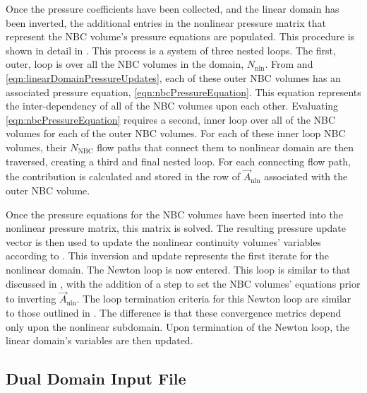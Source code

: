Once the pressure coefficients have been collected, and the linear domain has been inverted, the additional entries in the nonlinear pressure matrix that represent the NBC volume's pressure equations are populated.
This procedure is shown in detail in .
This process is a system of three nested loops.
The first, outer, loop is over all the NBC volumes in the domain, $N_{\text{nln}}$.
From  and \eqref{eqn:linearDomainPressureUpdates}, each of these outer NBC volumes has an associated pressure equation, \eqref{eqn:nbcPressureEquation}.
This equation represents the inter-dependency of all of the NBC volumes upon each other.
Evaluating \eqref{eqn:nbcPressureEquation} requires a second, inner loop over all of the NBC volumes for each of the outer NBC volumes.
For each of these inner loop NBC volumes, their $N_{\text{NBC}}$ flow paths that connect them to nonlinear domain are then traversed, creating a third and final nested loop.
For each connecting flow path, the contribution is calculated and stored in the row of $\vec{A}_{\text{nln}}$ associated with the outer NBC volume.

Once the pressure equations for the NBC volumes have been inserted into the nonlinear pressure matrix, this matrix is solved.
The resulting pressure update vector is then used to update the nonlinear continuity volumes' variables according to .
This inversion and update represents the first iterate for the nonlinear domain.
The Newton loop is now entered.
This loop is similar to that discussed in , with the addition of a step to set the NBC volumes' equations prior to inverting $\vec{A}_{\text{nln}}$.
The loop termination criteria for this Newton loop are similar to those outlined in .
The difference is that these convergence metrics depend only upon the nonlinear subdomain.
Upon termination of the Newton loop, the linear domain's variables are then updated.

\subsection{Dual Domain Input File}
\label{subsect:domDecompInputFile}

